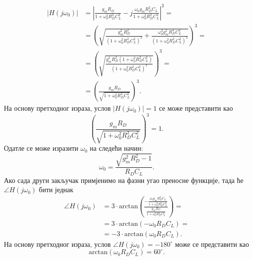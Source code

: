\documentclass[master]{finthesis}
\begin{document}
\begin{equation} 
	\label{osc_feedback_eq_12}
	\displaystyle
	\begin{split}
		|H(j\omega_{0})| &= \left|\frac{g_{m}R_{D}}{1+\omega_{0}^{2}R_{D}^{2}C_{L}^{2}}-j\frac{\omega_{0}g_{m}R_{D}^{2}C_{L}}{1+\omega_{0}^{2}R_{D}^{2}C_{L}^{2}}\right|^{3} = \\
				 &= \left(\sqrt{\frac{g_{m}^{2}R_{D}^{2}}{(1+\omega_{0}^{2}R_{D}^{2}C_{L}^{2})^{2}}+\frac{\omega_{0}^{2}g_{m}^{2}R_{D}^{4}C_{L}^{2}}{(1+\omega_{0}^{2}R_{D}^{2}C_{L}^{2})^{2}}}\right)^{3} = \\
				 &= \left(\sqrt{\frac{g_{m}^{2}R_{D}^{2}(1+\omega_{0}^{2}R_{D}^{2}C_{L}^{2})}{(1+\omega_{0}^{2}R_{D}^{2}C_{L}^{2})^{2}}}\right)^{3} = \\
				 &= \left(\frac{g_{m}R_{D}}{\sqrt{1+\omega_{0}^{2}R_{D}^{2}C_{L}^{2}}}\right)^{3}.
	\end{split}
\end{equation}
На основу претходног израза, услов $|H(j\omega_{0})|=1$ се може представити као
\begin{equation}
	\label{osc_feedback_eq_13}
	\displaystyle
	\left(\frac{g_{m}R_{D}}{\sqrt{1+\omega_{0}^{2}R_{D}^{2}C_{L}^{2}}}\right)^{3} = 1.
\end{equation}
Одатле се може изразити $\omega_{0}$ на следећи начин:
\begin{equation}
	\label{osc_feedback_eq_14}
	\displaystyle
	\omega_{0} = \frac{\sqrt{g_{m}^{2}R_{D}^{2}-1}}{R_{D}C_{L}}.
\end{equation}
Ако сада други закључак примјенимо на фазни угао преносне функције, тада ће $\angle H(j\omega_{0})$ бити једнак
\begin{equation}
	\label{osc_feedback_eq_15}
	\displaystyle
	\begin{split}
		\angle H(j\omega_{0}) &= 3\cdot\text{arctan}\left(\frac{\displaystyle -\frac{\omega_{0}g_{m}R_{D}^{2}C_{L}}{1+\omega_{0}^{2}R_{D}^{2}C_{L}^{2}}}{\displaystyle \frac{g_{m}R_{D}}{1+\omega_{0}^{2}R_{D}^{2}C_{L}^{2}}}\right) = \\
				     &= 3\cdot\text{arctan}(-\omega_{0}R_{D}C_{L}) = \\
				     &= -3\cdot\text{arctan}(\omega_{0}R_{D}C_{L}).
	\end{split}
\end{equation}
На основу претходног израза, услов $\angle H(j\omega_{0}) = -180^{\circ}$ може се представити као
\begin{equation}
	\label{osc_feedback_eq_16}
	\displaystyle
	\text{arctan}(\omega_{0}R_{D}C_{L}) = 60^{\circ}.
\end{equation}
\end{document}
